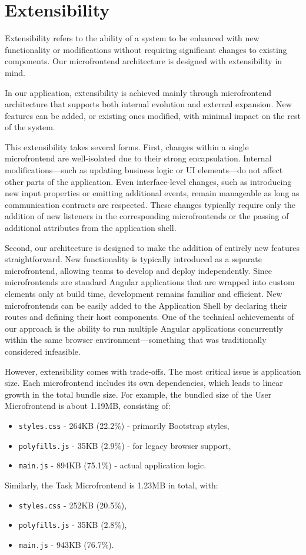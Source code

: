 \section{Extensibility}
Extensibility refers to the ability of a system to be enhanced with new functionality or modifications without requiring significant changes to existing components. Our microfrontend architecture is designed with extensibility in mind.

In our application, extensibility is achieved mainly through microfrontend architecture that supports both internal evolution and external expansion. New features can be added, or existing ones modified, with minimal impact on the rest of the system.

This extensibility takes several forms. First, changes within a single microfrontend are well-isolated due to their strong encapsulation. Internal modifications—such as updating business logic or UI elements—do not affect other parts of the application. Even interface-level changes, such as introducing new input properties or emitting additional events, remain manageable as long as communication contracts are respected. These changes typically require only the addition of new listeners in the corresponding microfrontends or the passing of additional attributes from the application shell.

Second, our architecture is designed to make the addition of entirely new features straightforward. New functionality is typically introduced as a separate microfrontend, allowing teams to develop and deploy independently. Since microfrontends are standard Angular applications that are wrapped into custom elements only at build time, development remains familiar and efficient. New microfrontends can be easily added to the Application Shell by declaring their routes and defining their host components. One of the technical achievements of our approach is the ability to run multiple Angular applications concurrently within the same browser environment—something that was traditionally considered infeasible.

However, extensibility comes with trade-offs. The most critical issue is application size. Each microfrontend includes its own dependencies, which leads to linear growth in the total bundle size. For example, the bundled size of the User Microfrontend is about 1.19MB, consisting of:
\begin{itemize}
    \item \texttt{styles.css} - 264KB (22.2\%) - primarily Bootstrap styles,
    \item \texttt{polyfills.js} - 35KB (2.9\%) - for legacy browser support,
    \item \texttt{main.js} - 894KB (75.1\%) - actual application logic.
\end{itemize}
Similarly, the Task Microfrontend is 1.23MB in total, with:
\begin{itemize}
    \item \texttt{styles.css} - 252KB (20.5\%),
    \item \texttt{polyfills.js} - 35KB (2.8\%),
    \item \texttt{main.js} - 943KB (76.7\%).
\end{itemize}

